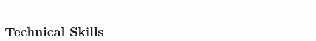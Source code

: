 \documentclass[12pt,letterpaper]{article}
\begin{document}















\noindent\rule{7.5in}{0.4pt}

\subsection*{Technical Skills}
\end{document}
